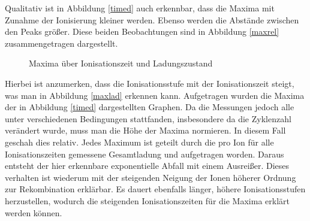         Qualitativ ist in Abbildung \ref{timed} auch erkennbar, dass die Maxima mit Zunahme der Ionisierung kleiner werden. Ebenso werden die Abstände zwischen den Peaks größer. Diese beiden Beobachtungen sind in Abbildung \ref{maxrel} zusammengetragen dargestellt.\\
        \begin{figure}
            \centering
            \caption{Maxima über Ionisationszeit und Ladungszustand}
            \label{max}
        \end{figure} 
        Hierbei ist anzumerken, dass die Ionisationsstufe mit der Ionisationszeit steigt, was man in Abbildung \ref{maxlad} erkennen kann. Aufgetragen wurden die Maxima der in Abbildung \ref{timed} dargestellten Graphen. Da die Messungen jedoch alle unter verschiedenen Bedingungen stattfanden, insbesondere da die Zyklenzahl verändert wurde, muss man die Höhe der Maxima normieren. In diesem Fall geschah dies relativ. Jedes Maximum ist geteilt durch die pro Ion für alle Ionisationszeiten gemessene Gesamtladung und aufgetragen worden. Daraus entsteht der hier erkennbare exponentielle Abfall mit einem Ausreißer.
        Dieses verhalten ist wiederum mit der steigenden Neigung der Ionen höherer Ordnung zur Rekombination erklärbar. Es dauert ebenfalls länger, höhere Ionisationsstufen herzustellen, wodurch die steigenden Ionisationszeiten für die Maxima erklärt werden können. 
        
        
        
        